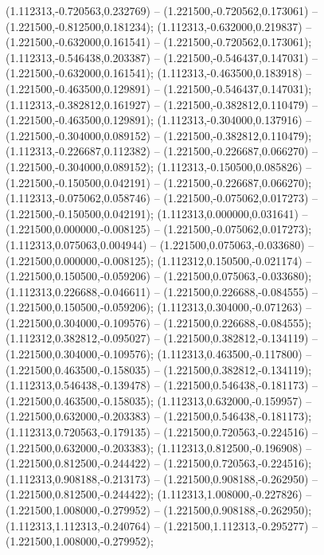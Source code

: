 (1.112313,-0.720563,0.232769) -- (1.221500,-0.720562,0.173061) -- (1.221500,-0.812500,0.181234);
 (1.112313,-0.632000,0.219837) -- (1.221500,-0.632000,0.161541) -- (1.221500,-0.720562,0.173061);
 (1.112313,-0.546438,0.203387) -- (1.221500,-0.546437,0.147031) -- (1.221500,-0.632000,0.161541);
 (1.112313,-0.463500,0.183918) -- (1.221500,-0.463500,0.129891) -- (1.221500,-0.546437,0.147031);
 (1.112313,-0.382812,0.161927) -- (1.221500,-0.382812,0.110479) -- (1.221500,-0.463500,0.129891);
 (1.112313,-0.304000,0.137916) -- (1.221500,-0.304000,0.089152) -- (1.221500,-0.382812,0.110479);
 (1.112313,-0.226687,0.112382) -- (1.221500,-0.226687,0.066270) -- (1.221500,-0.304000,0.089152);
 (1.112313,-0.150500,0.085826) -- (1.221500,-0.150500,0.042191) -- (1.221500,-0.226687,0.066270);
 (1.112313,-0.075062,0.058746) -- (1.221500,-0.075062,0.017273) -- (1.221500,-0.150500,0.042191);
 (1.112313,0.000000,0.031641) -- (1.221500,0.000000,-0.008125) -- (1.221500,-0.075062,0.017273);
 (1.112313,0.075063,0.004944) -- (1.221500,0.075063,-0.033680) -- (1.221500,0.000000,-0.008125);
 (1.112312,0.150500,-0.021174) -- (1.221500,0.150500,-0.059206) -- (1.221500,0.075063,-0.033680);
 (1.112313,0.226688,-0.046611) -- (1.221500,0.226688,-0.084555) -- (1.221500,0.150500,-0.059206);
 (1.112313,0.304000,-0.071263) -- (1.221500,0.304000,-0.109576) -- (1.221500,0.226688,-0.084555);
 (1.112312,0.382812,-0.095027) -- (1.221500,0.382812,-0.134119) -- (1.221500,0.304000,-0.109576);
 (1.112313,0.463500,-0.117800) -- (1.221500,0.463500,-0.158035) -- (1.221500,0.382812,-0.134119);
 (1.112313,0.546438,-0.139478) -- (1.221500,0.546438,-0.181173) -- (1.221500,0.463500,-0.158035);
 (1.112313,0.632000,-0.159957) -- (1.221500,0.632000,-0.203383) -- (1.221500,0.546438,-0.181173);
 (1.112313,0.720563,-0.179135) -- (1.221500,0.720563,-0.224516) -- (1.221500,0.632000,-0.203383);
 (1.112313,0.812500,-0.196908) -- (1.221500,0.812500,-0.244422) -- (1.221500,0.720563,-0.224516);
 (1.112313,0.908188,-0.213173) -- (1.221500,0.908188,-0.262950) -- (1.221500,0.812500,-0.244422);
 (1.112313,1.008000,-0.227826) -- (1.221500,1.008000,-0.279952) -- (1.221500,0.908188,-0.262950);
 (1.112313,1.112313,-0.240764) -- (1.221500,1.112313,-0.295277) -- (1.221500,1.008000,-0.279952);
